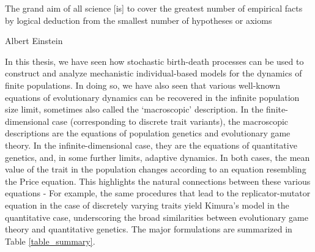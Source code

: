 \epigraph{\justifying The grand aim of all science [is] to cover the greatest number of empirical facts by logical deduction from the smallest number of hypotheses or axioms}{Albert Einstein}

\justifying
In this thesis, we have seen how stochastic birth-death processes can be used to construct and analyze mechanistic individual-based models for the dynamics of finite populations. In doing so, we have also seen that various well-known equations of evolutionary dynamics can be recovered in the infinite population size limit, sometimes also called the `macroscopic' description. In the finite-dimensional case (corresponding to discrete trait variants), the macroscopic descriptions are the equations of population genetics and evolutionary game theory. In the infinite-dimensional case, they are the equations of quantitative genetics, and, in some further limits, adaptive dynamics. In both cases, the mean value of the trait in the population changes according to an equation resembling the Price equation. This highlights the natural connections between these various equations - For example, the same procedures that lead to the replicator-mutator equation in the case of discretely varying traits yield Kimura's model in the quantitative case, underscoring the broad similarities between evolutionary game theory and quantitative genetics. The major formulations are summarized in Table \ref{table_summary}.

